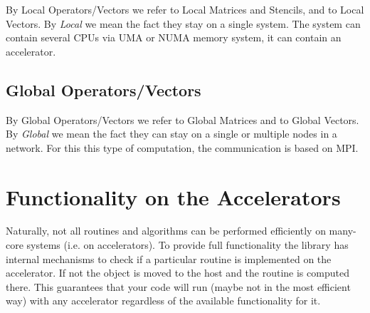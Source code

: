 By Local Operators/Vectors we refer to Local Matrices and Stencils, and to Local Vectors. By \emph{Local} we mean the fact they stay on a single system. The system can contain several CPUs via UMA or NUMA memory system, it can contain an accelerator. 

\subsection{Global Operators/Vectors}

By Global Operators/Vectors we refer to Global Matrices and to Global Vectors. By \emph{Global} we mean the fact they can stay on a single or multiple nodes in a network. For this this type of computation, the communication is based on MPI.

\section{Functionality on the Accelerators}

Naturally, not all routines and algorithms can be performed efficiently on many-core systems (i.e. on accelerators). To provide full functionality the library has internal mechanisms to check if a particular routine is implemented on the accelerator. If not the object is moved to the host and the routine is computed there. This guarantees that your code will run (maybe not in the most efficient way) with any accelerator regardless of the available functionality for it.



